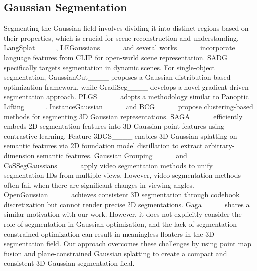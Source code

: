 \subsection{Gaussian Segmentation}
Segmenting the Gaussian field involves dividing it into distinct regions based on their properties, which is crucial for scene reconstruction and understanding. LangSplat____, LEGaussians____ and several works____ incorporate language features from CLIP for open-world scene representation. SADG____ specifically targets segmentation in dynamic scenes. For single-object segmentation, GaussianCut____ proposes a Gaussian distribution-based optimization framework, while GradiSeg____ develops a novel gradient-driven segmentation approach. PLGS____ adopts a methodology similar to Panoptic Lifting____. InstanceGaussian____ and BCG____ propose clustering-based methods for segmenting 3D Gaussian representations.
SAGA____ efficiently embeds 2D segmentation features into 3D Gaussian point features using contrastive learning. Feature 3DGS____ enables 3D Gaussian splatting on semantic features via 2D foundation model distillation to extract arbitrary-dimension semantic features. Gaussian Grouping____ and CoSSegGaussians____ apply video segmentation methods to unify segmentation IDs from multiple views, However, video segmentation methods often fail when there are significant changes in viewing angles. OpenGaussian____ achieves consistent 3D segmentation through codebook discretization but cannot render precise 2D segmentations. Gaga____ shares a similar motivation with our work. However, it does  not explicitly consider the role of segmentation in Gaussian optimization, and the lack of segmentation-constrained optimization can result in meaningless floaters in the 3D segmentation field. Our approach overcomes these challenges by using point map fusion and plane-constrained Gaussian splatting to create a compact and consistent 3D Gaussian segmentation field.